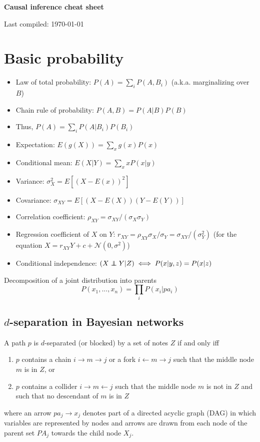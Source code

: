 \documentclass[11pt]{article}
\numberwithin{equation}{section}
\newcommand\indep{\protect\mathpalette{\protect\independenT}{\perp}}
\def\independenT#1#2{\mathrel{\rlap{$#1#2$}\mkern2mu{#1#2}}}
\begin{document}
\begin{flushleft}
\textbf{\Large Causal inference cheat sheet}
\end{flushleft}

\begin{flushleft}
Last compiled: \today
\end{flushleft}


\section{Basic probability}

\begin{itemize}[noitemsep]
\item Law of total probability: $P(A) = \sum_i P(A, B_i)$ (a.k.a. marginalizing over $B$)
\item Chain rule of probability: $P(A,B) = P(A|B) P(B)$
\item Thus, $P(A) = \sum_i P(A|B_i) P(B_i)$
\item Expectation: $E(g(X)) = \sum_x g(x) P(x)$
\item Conditional mean: $E(X|Y) = \sum_x x P(x|y)$
\item Variance: $\sigma_X^2 = E[(X - E(x))^2]$
\item Covariance: $\sigma_{XY} = E[(X-E(X))(Y-E(Y))]$
\item Correlation coefficient: $\rho_{XY}=\sigma_{XY}/(\sigma_X \sigma_Y)$
\item Regression coefficient of $X$ on $Y$: $r_{XY} = \rho_{XY} \sigma_X/\sigma_Y = \sigma_{XY}/(\sigma_Y^2)$ (for the equation $X = r_{XY} Y + c + \mathcal{N}(0, \sigma^2)$)
\item Conditional independence: $(X \indep Y | Z) \iff P(x|y,z) = P(x|z) $
\end{itemize}

Decomposition of a joint distribution into parents
\begin{equation}
P(x_1, ..., x_n) = \prod_i P(x_i|pa_i)
\end{equation}

\subsection{$d$-separation in Bayesian networks}
A path $p$ is $d$-separated (or blocked) by a set of notes $Z$ if and only iff
\begin{enumerate}[noitemsep]
\item $p$ contains a chain $i \rightarrow m \rightarrow j$ or a fork $i \leftarrow m \rightarrow j$ such that the middle node $m$ is in $Z$, or
\item $p$ contains a collider $i \rightarrow m \leftarrow j$ such that the middle node $m$ is not in $Z$ and such that no descendant of $m$ is in $Z$
\end{enumerate}
where an arrow $pa_j \rightarrow x_j$ denotes part of a directed acyclic graph (DAG) in which variables are represented by nodes and arrows are drawn from each node of the parent set $PA_j$ towards the child node $X_j$.
\end{document}
